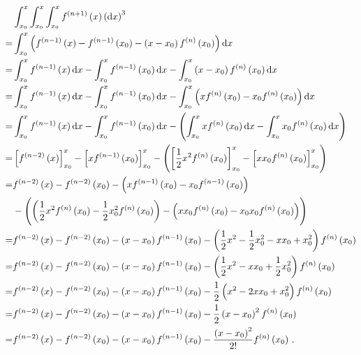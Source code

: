 \begin{align*}
  &\int_{x_0}^x\int_{x_0}^x\int_{x_0}^x{f^{\del{ n+1 }}\del{ x }} \del{ \dif x }^3 \\
  = &\int_{x_0}^x{\del{ f^{\del{ n-1 }}\del{ x } - f^{\del{ n-1 }}\del{ x_0 } - \del{ x - x_0 } f^{\del{ n }}\del{ x_0 } }}\dif x \\
  = &\int_{x_0}^x{f^{\del{ n-1 }}\del{ x }}\dif x - \int_{x_0}^x{f^{\del{ n-1 }}\del{ x_0 }}\dif x - \int_{x_0}^x\del{ x - x_0 }{f^{\del{ n }}\del{ x_0 }}\dif x \\
  = &\int_{x_0}^x{f^{\del{ n-1 }}\del{ x }}\dif x - \int_{x_0}^x{f^{\del{ n-1 }}\del{ x_0 }}\dif x - \int_{x_0}^x\del{x f^{\del{ n }}\del{ x_0 } - x_0 f^{\del{ n }}\del{ x_0 }}\dif x \\
  = &\int_{x_0}^x{f^{\del{ n-1 }}\del{ x }}\dif x - \int_{x_0}^x{f^{\del{ n-1 }}\del{ x_0 }}\dif x - \del{ \int_{x_0}^x{x f^{\del{ n }}\del{ x_0 }}\dif x - \int_{x_0}^x{x_0 f^{\del{ n }}\del{ x_0 }}\dif x } \\
  = &\sbr{ f^{\del{ n-2 }}\del{ x } }_{x_0}^x -\sbr{ x f^{\del{ n-1 }}\del{ x_0 } }_{x_0}^x - \del{ \sbr{ \frac{1}{2}x^2f^{\del{ n }}\del{ x_0 } }_{x_0}^x - \sbr{ xx_0f^{\del{ n }}\del{ x_0 } }_{x_0}^x } \\
  = &f^{\del{ n-2 }}\del{ x }
    - f^{\del{ n-2 }}\del{ x_0 }
    - \del{ x f^{\del{ n-1 }}\del{ x_0 }
    - x_0 f^{\del{ n-1 }}\del{ x_0 } } \\
  &- \del{ \del{ \frac{1}{2} x^2 f^{\del{ n }}\del{ x_0 }
    - \frac{1}{2} x_0^2 f^{\del{ n }}\del{ x_0 } }
    - \del{ x x_0 f^{\del{ n }}\del{ x_0 }
    - x_0 x_0 f^{\del{ n }}\del{ x_0 } } } \\
  = &f^{\del{ n-2 }}\del{ x }
    - f^{\del{ n-2 }}\del{ x_0 }
    - \del{ x - x_0 } f^{\del{ n-1 }}\del{ x_0 } - \del{ \frac{1}{2} x^2 - \frac{1}{2} x_0^2 - x x_0 + x_0^2 } f^{\del{ n }}\del{ x_0 } \\
  = &f^{\del{ n-2 }}\del{ x }
    - f^{\del{ n-2 }}\del{ x_0 }
    - \del{ x - x_0 } f^{\del{ n-1 }}\del{ x_0 } - \del{ \frac{1}{2} x^2 - x x_0 + \frac{1}{2} x_0^2 } f^{\del{ n }}\del{ x_0 } \\
  = &f^{\del{ n-2 }}\del{ x }
    - f^{\del{ n-2 }}\del{ x_0 }
    - \del{ x - x_0 } f^{\del{ n-1 }}\del{ x_0 } - \frac{1}{2} \del{ x^2 - 2 x x_0 + x_0^2 } f^{\del{ n }}\del{ x_0 } \\
  = &f^{\del{ n-2 }}\del{ x }
    - f^{\del{ n-2 }}\del{ x_0 }
    - \del{ x - x_0 } f^{\del{ n-1 }}\del{ x_0 } - \frac{1}{2} \del{ x - x_0 }^2 f^{\del{ n }}\del{ x_0 } \\
  = &f^{\del{ n-2 }}\del{ x }
    - f^{\del{ n-2 }}\del{ x_0 }
    - \del{ x - x_0 } f^{\del{ n-1 }}\del{ x_0 } - \frac{\del{ x - x_0 }^2}{2 !}  f^{\del{ n }}\del{ x_0 } \, .
\end{align*}
